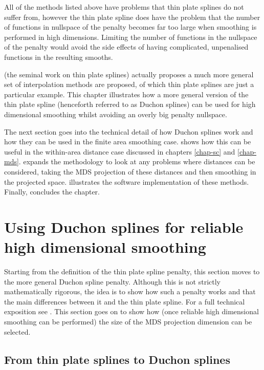 All of the methods listed above have problems that thin plate splines do not suffer from, however the thin plate spline does have the problem that the number of functions in nullspace of the penalty becomes far too large when smoothing is performed in high dimensions. Limiting the number of functions in the nullspace of the penalty would avoid the side effects of having complicated, unpenalised functions in the resulting smooths. 

 (the seminal work on thin plate splines) actually proposes a much more general set of interpolation methods are proposed, of which thin plate splines are just a particular example. This chapter illustrates how a more general version of the thin plate spline (henceforth referred to as Duchon splines) can be used for high dimensional smoothing whilst avoiding an overly big penalty nullspace.

The next section goes into the technical detail of how Duchon splines work and how they can be used in the finite area smoothing case.  shows how this can be useful in the within-area distance case discussed in chapters \ref{chap-sc} and \ref{chap-mds}.  expands the methodology to look at any problems where distances can be considered, taking the MDS projection of these distances and then smoothing in the projected space.  illustrates the software implementation of these methods. Finally,  concludes the chapter.

\section{Using Duchon splines for reliable high dimensional smoothing}

Starting from the definition of the thin plate spline penalty, this section moves to the more general Duchon spline penalty. Although this is not strictly mathematically rigorous, the idea is to show how such a penalty works and that the main differences between it and the thin plate spline. For a full technical exposition see . This section goes on to show how (once reliable high dimensional smoothing can be performed) the size of the MDS projection dimension can be selected.


\subsection{From thin plate splines to Duchon splines}
\label{gds-tprstoduchon}

